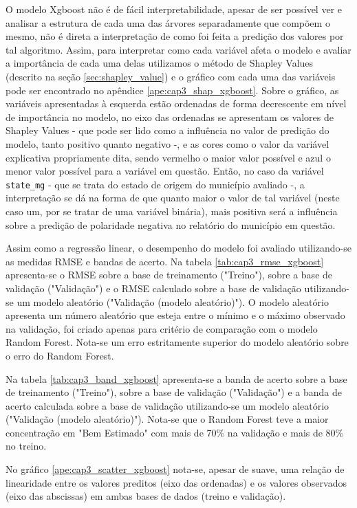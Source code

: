 O modelo Xgboost não é de fácil interpretabilidade, apesar de ser possível ver e analisar a estrutura de cada uma das árvores separadamente que compõem o mesmo, não é direta a interpretação de como foi feita a predição dos valores por tal algoritmo. Assim, para interpretar como cada variável afeta o modelo e avaliar a importância de cada uma delas utilizamos o método de Shapley Values (descrito na seção \ref{sec:shapley_value}) e o gráfico com cada uma das variáveis pode ser encontrado no apêndice \ref{ape:cap3_shap_xgboost}. Sobre o gráfico, as variáveis apresentadas à esquerda estão ordenadas de forma decrescente em nível de importância no modelo, no eixo das ordenadas se apresentam os valores de Shapley Values - que pode ser lido como a influência no valor de predição do modelo, tanto positivo quanto negativo -, e as cores como o valor da variável explicativa propriamente dita, sendo vermelho o maior valor possível e azul o menor valor possível para a variável em questão. Então, no caso da variável \verb|state_mg| - que se trata do estado de origem do município avaliado -, a interpretação se dá na forma de que quanto maior o valor de tal variável (neste caso um, por se tratar de uma variável binária), mais positiva será a influência sobre a predição de polaridade negativa no relatório do município em questão.

Assim como a regressão linear, o desempenho do modelo foi avaliado utilizando-se as medidas RMSE e bandas de acerto. Na tabela \ref{tab:cap3_rmse_xgboost} apresenta-se o RMSE sobre a base de treinamento ("Treino"), sobre a base de validação ("Validação") e o RMSE calculado sobre a base de validação utilizando-se um modelo aleatório ("Validação (modelo aleatório)"). O modelo aleatório apresenta um número aleatório que esteja entre o mínimo e o máximo observado na validação, foi criado apenas para critério de comparação com o modelo Random Forest. Nota-se um erro estritamente superior do modelo aleatório sobre o erro do Random Forest.

Na tabela \ref{tab:cap3_band_xgboost} apresenta-se a banda de acerto sobre a base de treinamento ("Treino"), sobre a base de validação ("Validação") e a banda de acerto calculada sobre a base de validação utilizando-se um modelo aleatório ("Validação (modelo aleatório)"). Nota-se que o Random Forest teve a maior concentração em "Bem Estimado" com mais de 70\% na validação e mais de 80\% no treino.

No gráfico \ref{ape:cap3_scatter_xgboost} nota-se, apesar de suave, uma relação de linearidade entre os valores preditos (eixo das ordenadas) e os valores observados (eixo das abscissas) em ambas bases de dados (treino e validação).

